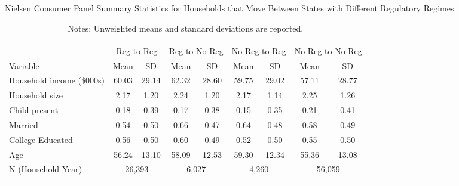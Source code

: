 \begin{table}[!htbp] \centering
\caption{Nielsen Consumer Panel Summary Statistics for Households that Move Between States with Different Regulatory Regimes}
\label{tab:summaryStatsUnitLawsMovers}
\begin{tabular}{lcccccccc}
\\[-1.8ex]\hline
\hline \\[-1.8ex]
                      & \multicolumn{2}{c}{Reg to Reg} & \multicolumn{2}{c}{Reg to No Reg} & \multicolumn{2}{c}{No Reg to Reg}  & \multicolumn{2}{c}{No Reg to No Reg} \\
Variable                  & Mean  & SD    & Mean  & SD    & Mean  & SD     & Mean    & SD  \\
\hline
Household income (\$000s) & 60.03 & 29.14 & 62.32 & 28.60 & 59.75 & 29.02  & 57.11   & 28.77 \\
Household size            & 2.17  & 1.20  & 2.24  & 1.20  & 2.17  & 1.14   & 2.25    & 1.26 \\
Child present             & 0.18  & 0.39  & 0.17  & 0.38  & 0.15  & 0.35   & 0.21    & 0.41 \\
Married                   & 0.54  & 0.50  & 0.66  & 0.47  & 0.64  & 0.48   & 0.58    & 0.49 \\
College Educated          & 0.56  & 0.50  & 0.60  & 0.49  & 0.52  & 0.50   & 0.55    & 0.50 \\
Age                       & 56.24 & 13.10 & 58.09 & 12.53 & 59.30 & 12.34  & 55.36   & 13.08\\
\hline
N (Household-Year)        & \multicolumn{2}{c}{26,393} & \multicolumn{2}{c}{6,027} & \multicolumn{2}{c}{4,260} & \multicolumn{2}{c}{56,059} \\
\hline
\hline \\[-1.8ex]
\end{tabular}
\caption*{Notes: Unweighted means and standard deviations are reported.}
\end{table}
